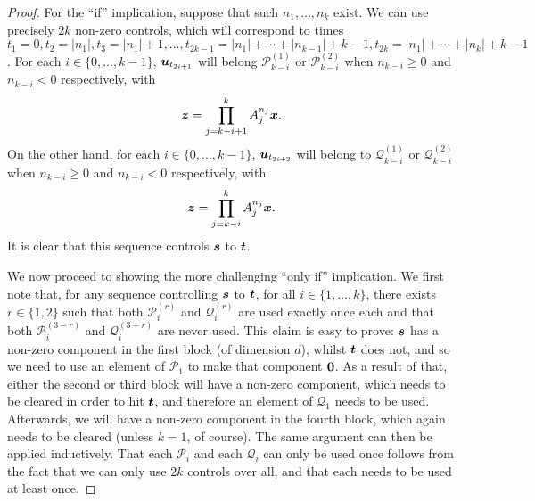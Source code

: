 \begin{proof}
For the ``if'' implication, suppose that such $n_{1}, \ldots, n_{k}$ exist.
We can use precisely $2k$ non-zero controls, which will correspond to times
$t_{1} = 0,
t_{2} = \lvert n_{1}\rvert,
t_{3} = \lvert n_{1} \rvert +1,
\ldots,
t_{2k-1} = \lvert n_{1} \rvert + \cdots + \lvert n_{k-1} \rvert + k-1,
t_{2k} = \lvert n_{1} \rvert + \cdots + \lvert n_{k} \rvert + k-1$.
For each $i \in \lbrace 0, \ldots, k-1 \rbrace$, $\boldsymbol{u}_{t_{2i+1}}$ will belong $\mathcal{P}_{k-i}^{(1)}$ or $\mathcal{P}_{k-i}^{(2)}$ when $n_{k-i} \geq 0$ and $n_{k-i} < 0$ respectively, with
\begin{equation*}
  \boldsymbol{z} = \prod\limits_{j=k-i+1}^{k} A_{j}^{n_{j}} \boldsymbol{x}.
\end{equation*}
On the other hand, for each $i \in \lbrace 0, \ldots, k-1 \rbrace$, $\boldsymbol{u}_{t_{2i+2}}$ will belong to $\mathcal{Q}_{k-i}^{(1)}$ or $\mathcal{Q}_{k-i}^{(2)}$ when $n_{k-i} \geq 0$ and $n_{k-i} < 0$ respectively, with
\begin{equation*}
  \boldsymbol{z} = \prod\limits_{j=k-i}^{k} A_{j}^{n_{j}} \boldsymbol{x}.
\end{equation*}
It is clear that this sequence controls $\boldsymbol{s}$ to $\boldsymbol{t}$.

We now proceed to showing the more challenging ``only if'' implication. We first note that, for any sequence controlling $\boldsymbol{s}$ to $\boldsymbol{t}$,
for all $i \in \lbrace 1, \ldots, k \rbrace$,
there exists $r \in \lbrace 1, 2 \rbrace$ such that both $\mathcal{P}_{i}^{(r)}$ and $\mathcal{Q}_{i}^{(r)}$ are used exactly once each
and that both $\mathcal{P}_{i}^{(3-r)}$ and $\mathcal{Q}_{i}^{(3-r)}$ are never used.
This claim is easy to prove: $\boldsymbol{s}$ has a non-zero component in the first block (of dimension $d$), whilst $\boldsymbol{t}$ does not,
and so we need to use an element of $\mathcal{P}_{1}$ to make that component $\boldsymbol{0}$.
As a result of that, either the second or third block will have a non-zero component, which needs to be cleared in order to hit $\boldsymbol{t}$,
and therefore an element of $\mathcal{Q}_{1}$ needs to be used. Afterwards, we will have a non-zero component in the fourth block,
which again needs to be cleared (unless $k=1$, of course). The same argument can then be applied inductively.
That each $\mathcal{P}_{i}$ and each $\mathcal{Q}_{i}$ can only be used once follows from the fact that we can only use $2k$ controls over all,
and that each needs to be used at least once.


\end{proof}
